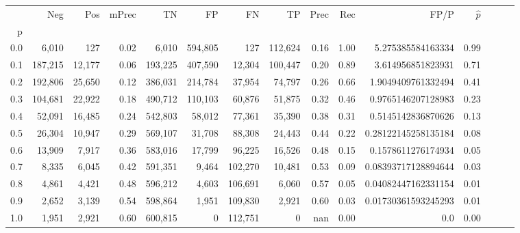 \begin{tabular}{rrrrrrrrrrrrrrr}
\toprule
{} &      Neg &     Pos & mPrec &       TN &       FP &       FN &       TP &  Prec &   Rec &                 FP/P & $\hat{p}$ \\
p   &          &         &       &          &          &          &          &       &       &                      &           \\
\midrule
0.0 &    6,010 &     127 &  0.02 &    6,010 &  594,805 &      127 &  112,624 &  0.16 &  1.00 &    5.275385584163334 &      0.99 \\
0.1 &  187,215 &  12,177 &  0.06 &  193,225 &  407,590 &   12,304 &  100,447 &  0.20 &  0.89 &    3.614956851823931 &      0.71 \\
0.2 &  192,806 &  25,650 &  0.12 &  386,031 &  214,784 &   37,954 &   74,797 &  0.26 &  0.66 &   1.9049409761332494 &      0.41 \\
0.3 &  104,681 &  22,922 &  0.18 &  490,712 &  110,103 &   60,876 &   51,875 &  0.32 &  0.46 &   0.9765146207128983 &      0.23 \\
0.4 &   52,091 &  16,485 &  0.24 &  542,803 &   58,012 &   77,361 &   35,390 &  0.38 &  0.31 &   0.5145142836870626 &      0.13 \\
0.5 &   26,304 &  10,947 &  0.29 &  569,107 &   31,708 &   88,308 &   24,443 &  0.44 &  0.22 &  0.28122145258135184 &      0.08 \\
0.6 &   13,909 &   7,917 &  0.36 &  583,016 &   17,799 &   96,225 &   16,526 &  0.48 &  0.15 &   0.1578611276174934 &      0.05 \\
0.7 &    8,335 &   6,045 &  0.42 &  591,351 &    9,464 &  102,270 &   10,481 &  0.53 &  0.09 &  0.08393717128894644 &      0.03 \\
0.8 &    4,861 &   4,421 &  0.48 &  596,212 &    4,603 &  106,691 &    6,060 &  0.57 &  0.05 &  0.04082447162331154 &      0.01 \\
0.9 &    2,652 &   3,139 &  0.54 &  598,864 &    1,951 &  109,830 &    2,921 &  0.60 &  0.03 &  0.01730361593245293 &      0.01 \\
1.0 &    1,951 &   2,921 &  0.60 &  600,815 &        0 &  112,751 &        0 &   nan &  0.00 &                  0.0 &      0.00 \\
\bottomrule
\end{tabular}
